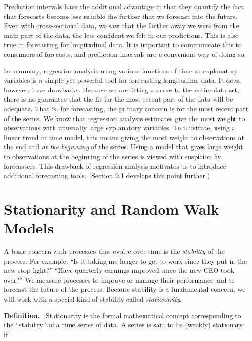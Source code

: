 Prediction intervals have the additional advantage in that they
quantify the fact that forecasts become less reliable the further
that we forecast into the future. Even with cross-sectional data, we
saw that the farther away we were from the main part of the data,
the less confident we felt in our predictions. This is also true in
forecasting for longitudinal data. It is important to communicate
this to consumers of forecasts, and prediction intervals are a
convenient way of doing so.


In summary, regression analysis using various functions of time as
explanatory variables is a simple yet powerful tool for forecasting
longitudinal data. It does, however, have drawbacks. Because we are
fitting a curve to the entire data set, there is no guarantee that
the fit for the most recent part of the data will be adequate. That
is, for forecasting, the primary concern is for the most recent part
of the series. We know that regression analysis estimates give the
most weight to observations with unusually large explanatory
variables. To illustrate, using a linear trend in time model, this
means giving the most weight to observations at the end and \emph{at
the beginning }of the series. Using a model that gives large weight
to observations at the beginning of the series is viewed with
suspicion by forecasters. This drawback of regression analysis
motivates us to introduce additional forecasting tools. (Section 9.1
develops this point further.)

\section{Stationarity and Random Walk Models}\label{S7:RandomWalk}

A basic concern with processes that evolve over time is the
\emph{stability} of the process. For example: ``Is it taking me
longer to get to work since they put in the new stop light?'' ``Have
quarterly earnings improved since the new CEO took over?'' We
measure processes to improve or manage their performance and to
forecast the future of the process. Because stability is a
fundamental concern, we will work with a special kind of stability
called \emph{stationarity}.\bigskip

\boxedjed

\textbf{Definition.} \ Stationarity is the formal mathematical
concept corresponding to the ``stability'' of a time series of data.
A series is said to be (weakly) stationary if

